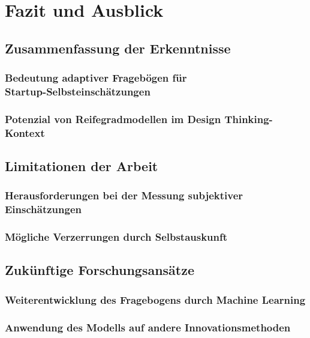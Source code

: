 \chapter{Fazit und Ausblick}

\section{Zusammenfassung der Erkenntnisse}
\subsection{Bedeutung adaptiver Fragebögen für \\ Startup-Selbsteinschätzungen}
\subsection{Potenzial von Reifegradmodellen im Design Thinking-Kontext}

\section{Limitationen der Arbeit}
\subsection{Herausforderungen bei der Messung subjektiver Einschätzungen}
\subsection{Mögliche Verzerrungen durch Selbstauskunft}

\section{Zukünftige Forschungsansätze}
\subsection{Weiterentwicklung des Fragebogens durch Machine Learning}
\subsection{Anwendung des Modells auf andere Innovationsmethoden}